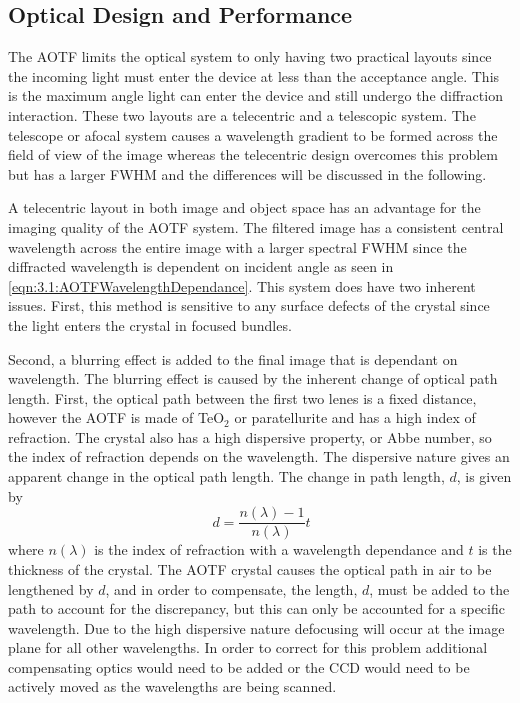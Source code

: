 \documentclass[12pt]{article}
\begin{document}
\subsection{Optical Design and Performance}

The AOTF limits the optical system to only having two practical layouts since the incoming light must enter the device at less than the acceptance angle. This is the maximum angle light can enter the device and still undergo the diffraction interaction. These two layouts are a telecentric and a telescopic system. The telescope or afocal system causes a wavelength gradient to be formed across the field of view of the image whereas the telecentric design overcomes this problem but has a larger FWHM \citep{Suhre2004} and the differences will be discussed in the following.

A telecentric layout in both image and object space has an advantage for the imaging quality of the AOTF system. The filtered image has a consistent central wavelength across the entire image with a larger spectral FWHM since the diffracted wavelength is dependent on incident angle as seen in \autoref{eqn:3.1:AOTFWavelengthDependance}. This system does have two inherent issues. First, this method is sensitive to any surface defects of the crystal since the light enters the crystal in focused bundles.

Second, a blurring effect is added to the final image that is dependant on wavelength. The blurring effect is caused by the inherent change of optical path length. First, the optical path between the first two lenes is a fixed distance, however the AOTF is made of TeO$_{2}$ or paratellurite and has a high index of refraction. The crystal also has a high dispersive property, or Abbe number, so the index of refraction depends on the wavelength. The dispersive nature gives an apparent change in the optical path length. The change in path length, $d$, is given by
\begin{equation}
    \ d = \frac{n(\lambda)-1}{n(\lambda)}t
    \label{eqn:3.2:opticalPathDisplacement}
\end{equation}
where $n(\lambda)$ is the index of refraction with a wavelength dependance and $t$ is the thickness of the crystal. The AOTF crystal causes the optical path in air to be lengthened by $d$, and in order to compensate, the length, $d$, must be added to the path to account for the discrepancy, but this can only be accounted for a specific wavelength. Due to the high dispersive nature defocusing will occur at the image plane for all other wavelengths. In order to correct for this problem additional compensating optics would need to be added or the CCD would need to be actively moved as the wavelengths are being scanned.
\end{document}
